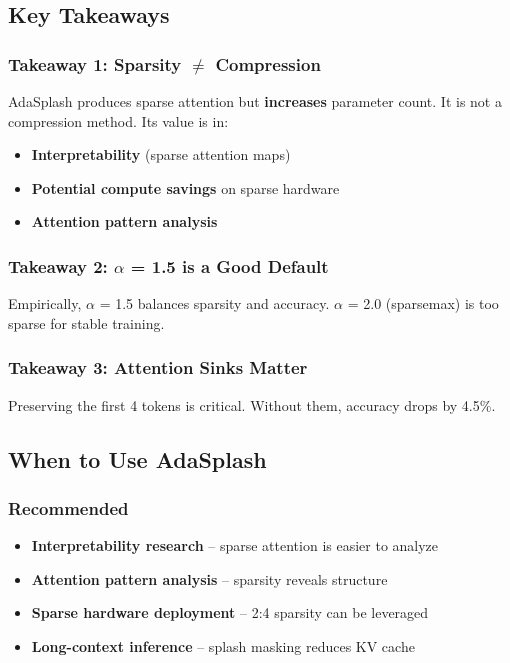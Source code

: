 \subsection{Key Takeaways}

\subsubsection{Takeaway 1: Sparsity $\ne$ Compression}

AdaSplash produces sparse attention but \textbf{increases} parameter count. 
It is not a compression method. Its value is in:
\begin{itemize}
\item \textbf{Interpretability} (sparse attention maps)
\item \textbf{Potential compute savings} on sparse hardware
\item \textbf{Attention pattern analysis}

\end{itemize}
\subsubsection{Takeaway 2: $\alpha$ = 1.5 is a Good Default}

Empirically, $\alpha$ = 1.5 balances sparsity and accuracy. $\alpha$ = 2.0 (sparsemax) 
is too sparse for stable training.

\subsubsection{Takeaway 3: Attention Sinks Matter}

Preserving the first 4 tokens is critical. Without them, accuracy drops by 
4.5\%.

\subsection{When to Use AdaSplash}

\subsubsection{Recommended}

\begin{itemize}
\item \textbf{Interpretability research} -- sparse attention is easier to analyze
\item \textbf{Attention pattern analysis} -- sparsity reveals structure
\item \textbf{Sparse hardware deployment} -- 2:4 sparsity can be leveraged
\item \textbf{Long-context inference} -- splash masking reduces KV cache

\end{itemize}
